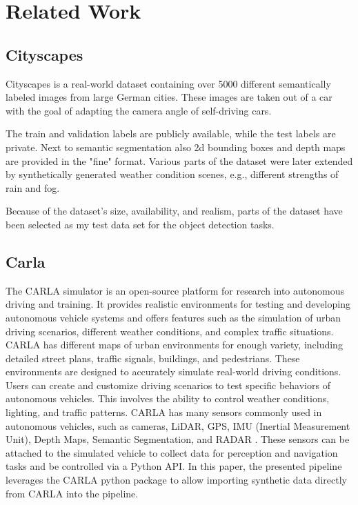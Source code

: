 \chapter{Related Work}

\section{Cityscapes}
\label{ch:cityscapes}
Cityscapes \cite{cordts2016cityscapesdatasetsemanticurban} is a real-world dataset containing over 5000 different semantically labeled images from large German cities. These images are taken out of a car with the goal of adapting the camera angle of self-driving cars. 

The train and validation labels are publicly available, while the test labels are private. Next to semantic segmentation also 2d bounding boxes and depth maps are provided in the "fine" format. Various parts of the dataset were later extended by synthetically generated weather condition scenes, e.g., different strengths of rain and fog. 

Because of the dataset's size, availability, and realism, parts of the dataset have been selected as my test data set for the object detection tasks. \cite{cordts2016cityscapesdatasetsemanticurban} 

\section{Carla}
\label{ch:carla}
The CARLA simulator \cite{dosovitskiy2017carlaopenurbandriving} is an open-source platform for research into autonomous driving and training. It provides realistic environments for testing and developing autonomous vehicle systems and offers features such as the simulation of urban driving scenarios, different weather conditions, and complex traffic situations. CARLA has different maps of urban environments for enough variety, including detailed street plans, traffic signals, buildings, and pedestrians. These environments are designed to accurately simulate real-world driving conditions. Users can create and customize driving scenarios to test specific behaviors of autonomous vehicles. This involves the ability to control weather conditions, lighting, and traffic patterns.
CARLA has many sensors commonly used in autonomous vehicles, such as cameras, LiDAR, GPS, IMU (Inertial Measurement Unit), Depth Maps, Semantic Segmentation, and RADAR \cite{dosovitskiy2017carlaopenurbandriving}. These sensors can be attached to the simulated vehicle to collect data for perception and navigation tasks and be controlled via a Python API. \cite{dosovitskiy2017carlaopenurbandriving}
In this paper, the presented pipeline leverages the CARLA python package to allow importing synthetic data directly from CARLA into the pipeline.

